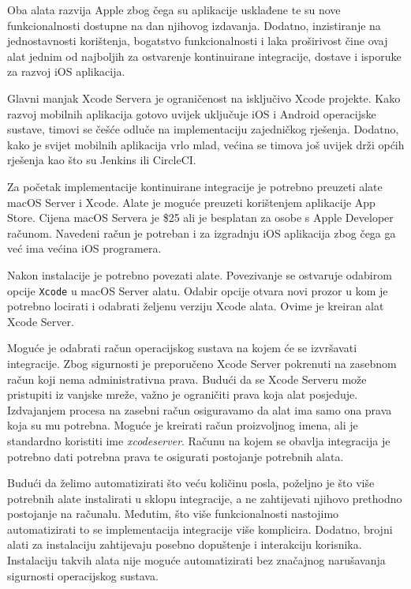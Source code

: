 \documentclass[times, utf8, diplomski, numeric]{fer}
\begin{document}
Oba alata razvija Apple zbog čega su aplikacije usklađene te su nove funkcionalnosti dostupne na dan njihovog izdavanja. Dodatno, inzistiranje na jednostavnosti korištenja, bogatstvo funkcionalnosti i laka proširivost čine ovaj alat jednim od najboljih za ostvarenje kontinuirane integracije, dostave i isporuke za razvoj iOS aplikacija.

Glavni manjak Xcode Servera je ograničenost na isključivo Xcode projekte. Kako razvoj mobilnih aplikacija gotovo uvijek uključuje iOS i Android operacijske sustave, timovi se češće odluče na implementaciju zajedničkog rješenja. Dodatno, kako je svijet mobilnih aplikacija vrlo mlad, većina se timova još uvijek drži općih rješenja kao što su Jenkins ili CircleCI.

Za početak implementacije kontinuirane integracije je potrebno preuzeti alate macOS Server i Xcode. Alate je moguće preuzeti korištenjem aplikacije App Store. Cijena macOS Servera je \$25 ali je besplatan za osobe s Apple Developer računom. Navedeni račun je potreban i za izgradnju iOS aplikacija zbog čega ga već ima većina iOS programera.

Nakon instalacije je potrebno povezati alate. Povezivanje se ostvaruje odabirom opcije \verb|Xcode| u macOS Server alatu. Odabir opcije otvara novi prozor u kom je potrebno locirati i odabrati željenu verziju Xcode alata. Ovime je kreiran alat Xcode Server.

Moguće je odabrati račun operacijskog sustava na kojem će se izvršavati integracije. Zbog sigurnosti je preporučeno Xcode Server pokrenuti na zasebnom račun koji nema administrativna prava. Budući da se Xcode Serveru može pristupiti iz vanjske mreže, važno je ograničiti prava koja alat posjeduje. Izdvajanjem procesa na zasebni račun osiguravamo da alat ima samo ona prava koja su mu potrebna. Moguće je kreirati račun proizvoljnog imena, ali je standardno koristiti ime \textit{xcodeserver}. Računu na kojem se obavlja integracija je potrebno dati potrebna prava te osigurati postojanje potrebnih alata.

Budući da želimo automatizirati što veću količinu posla, poželjno je što više potrebnih alate instalirati u sklopu integracije, a ne zahtijevati njihovo prethodno postojanje na računalu. Međutim, što više funkcionalnosti nastojimo automatizirati to se implementacija integracije više komplicira. Dodatno, brojni alati za instalaciju zahtijevaju posebno dopuštenje i interakciju korisnika. Instalaciju takvih alata nije moguće automatizirati bez značajnog narušavanja sigurnosti operacijskog sustava.
\end{document}
